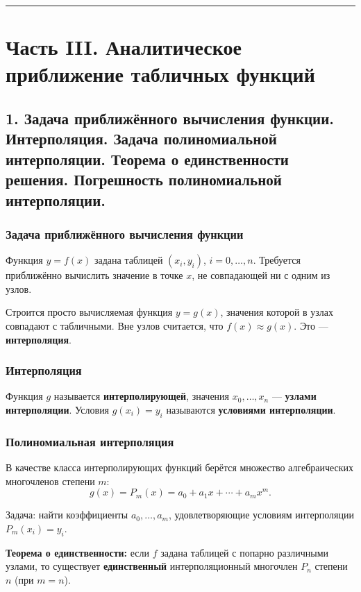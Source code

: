 \documentclass[14pt,a4paper]{extarticle}
\begin{document}
\hrule\bigskip

\section{Часть III. Аналитическое приближение табличных функций}

\subsection{1. Задача приближённого вычисления функции. Интерполяция. Задача полиномиальной интерполяции. Теорема о единственности решения. Погрешность полиномиальной интерполяции.}

\subsubsection{Задача приближённого вычисления функции}

Функция $y = f(x)$ задана таблицей $(x_i, y_i)$, $i = 0, \ldots, n$. Требуется приближённо вычислить значение в точке $x$, не совпадающей ни с одним из узлов.

Строится просто вычисляемая функция $y = g(x)$, значения которой в узлах совпадают с табличными. Вне узлов считается, что $f(x) \approx g(x)$. Это --- \textbf{интерполяция}.

\subsubsection{Интерполяция}

Функция $g$ называется \textbf{интерполирующей}, значения $x_0, \ldots, x_n$ --- \textbf{узлами интерполяции}. Условия $g(x_i) = y_i$ называются \textbf{условиями интерполяции}.

\subsubsection{Полиномиальная интерполяция}

В качестве класса интерполирующих функций берётся множество алгебраических многочленов степени $m$:
\[g(x) = P_m(x) = a_0 + a_1 x + \cdots + a_m x^m.\]

Задача: найти коэффициенты $a_0, \ldots, a_m$, удовлетворяющие условиям интерполяции $P_m(x_i) = y_i$.

\textbf{Теорема о единственности:} если $f$ задана таблицей с попарно различными узлами, то существует \textbf{единственный} интерполяционный многочлен $P_n$ степени $n$ (при $m = n$).
\end{document}
